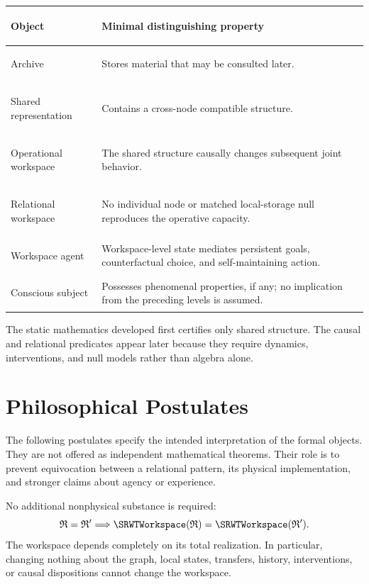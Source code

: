 
\begin{center}
\small
\begin{tabularx}{\textwidth}{@{}>{\bfseries\raggedright\arraybackslash}p{}>{\raggedright\arraybackslash}X@{}}
\toprule
Object & Minimal distinguishing property \\
\midrule
Archive & Stores material that may be consulted later. \\
Shared representation & Contains a cross-node compatible structure. \\
Operational workspace & The shared structure causally changes subsequent joint behavior. \\
Relational workspace & No individual node or matched local-storage null reproduces the operative capacity. \\
Workspace agent & Workspace-level state mediates persistent goals, counterfactual choice, and self-maintaining action. \\
Conscious subject & Possesses phenomenal properties, if any; no implication from the preceding levels is assumed. \\
\bottomrule
\end{tabularx}
\end{center}

The static mathematics developed first certifies only shared structure. The
causal and relational predicates appear later because they require dynamics,
interventions, and null models rather than algebra alone.

\section{Philosophical Postulates}

The following postulates specify the intended interpretation of the formal
objects. They are not offered as independent mathematical theorems. Their
role is to prevent equivocation between a relational pattern, its physical
implementation, and stronger claims about agency or experience.


No additional nonphysical substance is required:
\[
\mathfrak R=\mathfrak R'
\Longrightarrow
\SRWTWorkspace(\mathfrak R)=\SRWTWorkspace(\mathfrak R').
\]
The workspace depends completely on its total realization. In particular,
changing nothing about the graph, local states, transfers, history,
interventions, or causal dispositions cannot change the workspace.

